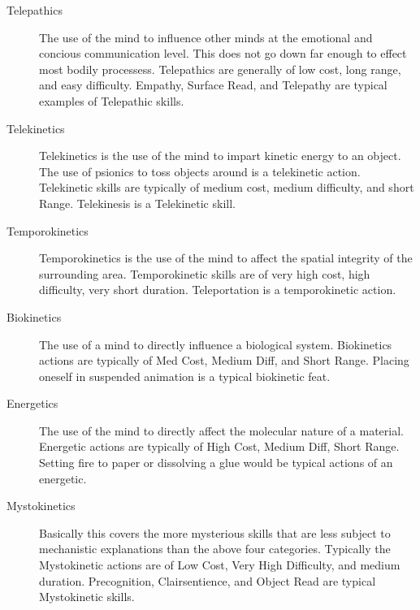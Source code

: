 \documentclass{book}
\begin{document}
\begin{description}

    \item[Telepathics]

    The use of the mind to influence other minds at the emotional and concious
    communication level. This does not go down far enough to effect most bodily
    processess. Telepathics are generally of low cost, long range, and
    easy difficulty. Empathy, Surface Read, and Telepathy are typical
    examples of Telepathic skills.

	\item[Telekinetics]

	Telekinetics is the use of the mind to impart kinetic energy to an
	object. The use of psionics to toss objects around is a telekinetic 
	action. Telekinetic skills are typically of medium cost, medium
    difficulty, and short Range. Telekinesis is a Telekinetic skill.


	\item[Temporokinetics]

	Temporokinetics is the use of the mind to affect the spatial integrity
	of the surrounding area. Temporokinetic skills are of very high cost,
    high difficulty, very short duration. Teleportation is a temporokinetic
    action.

	\item[Biokinetics]

	The use of a mind to directly influence a biological system.
    Biokinetics actions are typically of Med Cost, Medium Diff, and
    Short Range. Placing oneself in suspended animation is a
    typical biokinetic feat.

	\item[Energetics]

	The use of the mind to directly affect the molecular nature of a
	material. Energetic actions are typically of  High Cost, Medium Diff,
    Short Range. Setting fire to paper or dissolving a glue would be 
	typical actions of an energetic.

	\item[Mystokinetics]

    Basically this covers the more mysterious skills that are less subject
    to mechanistic explanations than the above four categories. 
    Typically the Mystokinetic actions are of Low Cost, Very High Difficulty,
    and medium duration.
    Precognition, Clairsentience, and Object Read are typical
    Mystokinetic skills.

\end{description}
\end{document}
